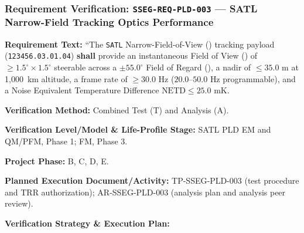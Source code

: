 \subsubsection{Requirement Verification: \texttt{SSEG-REQ-PLD-003} --- SATL Narrow-Field Tracking Optics Performance}
\label{ver:SSEG-REQ-PLD-003}
\textbf{Requirement Text:} ``The \texttt{SATL} Narrow-Field-of-View () tracking payload (\texttt{123456.03.01.04}) \textbf{shall} provide an instantaneous Field of View () of $\ge 1.5^\circ \times 1.5^\circ$ steerable across a $\pm 55.0^\circ$ Field of Regard (), a nadir  of $\le 35.0\text{ m}$ at 1,000~km altitude, a frame rate of $\ge 30.0\text{ Hz}$ ($20.0\text{--}50.0\text{ Hz}$ programmable), and a Noise Equivalent Temperature Difference $\text{NETD} \le 25.0\text{ mK}$.
\par\textbf{Verification Method:} Combined Test (T) and Analysis (A).
\par\textbf{Verification Level/Model \& Life-Profile Stage:} SATL PLD EM and QM/PFM, Phase 1; FM, Phase 3.
\par\textbf{Project Phase:} B, C, D, E.
\par\textbf{Planned Execution Document/Activity:} TP-SSEG-PLD-003 (test procedure and TRR authorization); AR-SSEG-PLD-003 (analysis plan and analysis peer review).
\par\textbf{Verification Strategy \& Execution Plan:}
